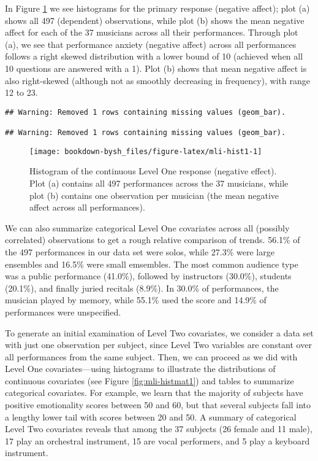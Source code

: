 \documentclass[
]{krantz}
\begin{document}
In Figure \ref{fig:mli-hist1} we see histograms for the primary response (negative affect); plot (a) shows all 497 (dependent) observations, while plot (b) shows the mean negative affect for each of the 37 musicians across all their performances. Through plot (a), we see that performance anxiety (negative affect) across all performances follows a right skewed distribution with a lower bound of 10 (achieved when all 10 questions are answered with a 1). Plot (b) shows that mean negative affect is also right-skewed (although not as smoothly decreasing in frequency), with range 12 to 23.

\begin{verbatim}
## Warning: Removed 1 rows containing missing values (geom_bar).

## Warning: Removed 1 rows containing missing values (geom_bar).
\end{verbatim}

\begin{figure}

{\centering \texttt{[image: bookdown-bysh\_files/figure-latex/mli-hist1-1]} 

}

\caption{Histogram of the continuous Level One response (negative effect). Plot (a) contains all 497 performances across the 37 musicians, while plot (b) contains one observation per musician (the mean negative affect across all performances).}\label{fig:mli-hist1}
\end{figure}

We can also summarize categorical Level One covariates across all (possibly correlated) observations to get a rough relative comparison of trends. 56.1\% of the 497 performances in our data set were solos, while 27.3\% were large ensembles and 16.5\% were small emsembles. The most common audience type was a public performance (41.0\%), followed by instructors (30.0\%), students (20.1\%), and finally juried recitals (8.9\%). In 30.0\% of performances, the musician played by memory, while 55.1\% used the score and 14.9\% of performances were unspecified.

To generate an initial examination of Level Two covariates, we consider a data set with just one observation per subject, since Level Two variables are constant over all performances from the same subject. Then, we can proceed as we did with Level One covariates---using histograms to illustrate the distributions of continuous covariates (see Figure \ref{fig:mli-histmat1}) and tables to summarize categorical covariates. For example, we learn that the majority of subjects have positive emotionality scores between 50 and 60, but that several subjects fall into a lengthy lower tail with scores between 20 and 50. A summary of categorical Level Two covariates reveals that among the 37 subjects (26 female and 11 male), 17 play an orchestral instrument, 15 are vocal performers, and 5 play a keyboard instrument.
\end{document}
